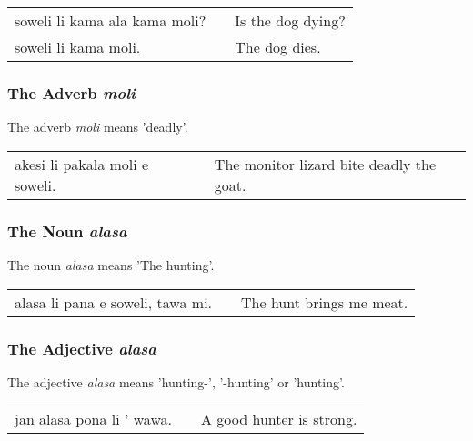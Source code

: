 \begin{supertabular}{p{5,5cm}|ll}
    soweli li kama ala kama moli? &  & Is the dog dying? \\
    soweli li kama moli.          &  & The dog dies.     \\
\end{supertabular}

%
%
\subsubsection*{The Adverb \textit{moli}}
%
%
The adverb \textit{moli} means 'deadly'.

\begin{supertabular}{p{5,5cm}|ll}
    akesi li pakala moli e soweli. &  & The monitor lizard bite deadly the goat. \\
\end{supertabular}

%
%
\subsubsection*{The Noun \textit{alasa}}
%

The noun \textit{alasa} means 'The hunting'.

\begin{supertabular}{p{5,5cm}|ll}
    alasa li pana e soweli, tawa mi. &  & The hunt brings me meat. \\
\end{supertabular}

%
\subsubsection*{The Adjective \textit{alasa}}
%

The adjective \textit{alasa} means 'hunting-', '-hunting' or 'hunting'.

\begin{supertabular}{p{5,5cm}|ll}
    jan alasa pona li ' wawa. &  & A good hunter is strong. \\
\end{supertabular}

